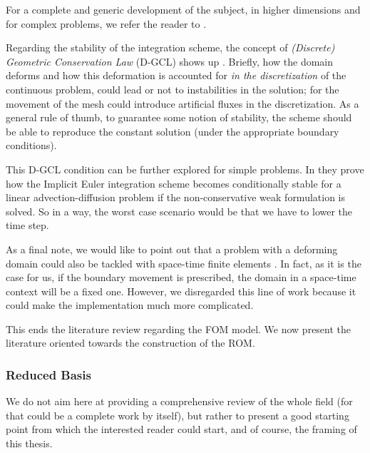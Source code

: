 For a complete and generic development of the subject,
in higher dimensions and for complex problems,
we refer the reader to 
\cite{doneaALE,
DONEA1982689}.

Regarding the stability of the integration scheme,
the concept of \textit{(Discrete) Geometric Conservation Law} (D-GCL) shows up 
\cite{HUGHES2000467,
GUILLARD20001467,
FARHAT2001669,
LESOINNE199671}.
Briefly, how the domain deforms and how this deformation is accounted for
\textit{in the discretization} of the continuous problem,
could lead or not to instabilities in the solution; 
for the movement of the mesh could introduce artificial fluxes in the discretization.
As a general rule of thumb, 
to guarantee some notion of stability,
the scheme should be able to reproduce the constant solution 
(under the appropriate boundary conditions).

This D-GCL condition can be further explored for simple problems.
In \cite{formaggiaALE} they prove how the Implicit Euler integration scheme
becomes conditionally stable for a linear advection-diffusion problem
if the non-conservative weak formulation is solved.
So in a way, the worst case scenario would be that we have to lower the time step.

As a final note, 
we would like to point out that a problem with a deforming domain
could also be tackled with \mbox{space-time} finite elements 
\cite{TEZDUYAR1992339}.
In fact, as it is the case for us, 
if the boundary movement is prescribed,
the domain in a \mbox{space-time} context will be a fixed one.
However, 
we disregarded this line of work because it could make the implementation much more complicated.

This ends the literature review regarding the FOM model.
We now present the literature oriented towards the construction of the ROM.

\subsubsection{Reduced Basis}
We do not aim here at providing a comprehensive review of the whole field
(for that could be a complete work by itself),
but rather to present a good starting point 
from which the interested reader could start, 
and of course, the framing of this thesis.

